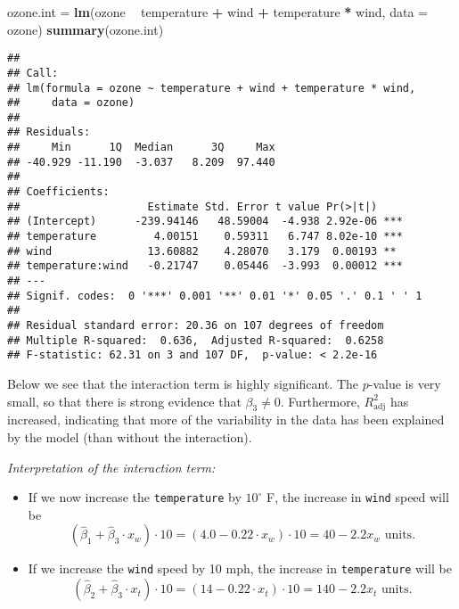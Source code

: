 \documentclass[ignorenonframetext,]{beamer}
\newenvironment{Shaded}{\begin{snugshade}}{\end{snugshade}}
\newcommand{\KeywordTok}[1]{\textcolor[rgb]{0.13,0.29,0.53}{\textbf{#1}}}
\newcommand{\DataTypeTok}[1]{\textcolor[rgb]{0.13,0.29,0.53}{#1}}
\newcommand{\StringTok}[1]{\textcolor[rgb]{0.31,0.60,0.02}{#1}}
\newcommand{\OperatorTok}[1]{\textcolor[rgb]{0.81,0.36,0.00}{\textbf{#1}}}
\newcommand{\NormalTok}[1]{#1}
\begin{document}
\begin{frame}[fragile]

\footnotesize

\begin{Shaded}
\begin{Highlighting}[]
\NormalTok{ozone.int =}\StringTok{ }\KeywordTok{lm}\NormalTok{(ozone }\OperatorTok{~}\StringTok{ }\NormalTok{temperature }\OperatorTok{+}\StringTok{ }\NormalTok{wind }\OperatorTok{+}\StringTok{ }\NormalTok{temperature }\OperatorTok{*}\StringTok{ }\NormalTok{wind, }\DataTypeTok{data =}\NormalTok{ ozone)}
\KeywordTok{summary}\NormalTok{(ozone.int)}
\end{Highlighting}
\end{Shaded}

\begin{verbatim}
## 
## Call:
## lm(formula = ozone ~ temperature + wind + temperature * wind, 
##     data = ozone)
## 
## Residuals:
##     Min      1Q  Median      3Q     Max 
## -40.929 -11.190  -3.037   8.209  97.440 
## 
## Coefficients:
##                    Estimate Std. Error t value Pr(>|t|)    
## (Intercept)      -239.94146   48.59004  -4.938 2.92e-06 ***
## temperature         4.00151    0.59311   6.747 8.02e-10 ***
## wind               13.60882    4.28070   3.179  0.00193 ** 
## temperature:wind   -0.21747    0.05446  -3.993  0.00012 ***
## ---
## Signif. codes:  0 '***' 0.001 '**' 0.01 '*' 0.05 '.' 0.1 ' ' 1
## 
## Residual standard error: 20.36 on 107 degrees of freedom
## Multiple R-squared:  0.636,  Adjusted R-squared:  0.6258 
## F-statistic: 62.31 on 3 and 107 DF,  p-value: < 2.2e-16
\end{verbatim}

\normalsize

\end{frame}

\begin{frame}

Below we see that the interaction term is highly significant. The
\(p\)-value is very small, so that there is strong evidence that
\(\beta_3 \neq 0\). Furthermore, \(R^2_{\text{adj}}\) has increased,
indicating that more of the variability in the data has been explained
by the model (than without the interaction).

\end{frame}

\begin{frame}[fragile]

\emph{Interpretation of the interaction term:}

\begin{itemize}
\item
  If we now increase the \texttt{temperature} by \(10^{\circ}\) F, the
  increase in \texttt{wind} speed will be
  \[(\hat \beta_1+\hat \beta_3 \cdot x_w) \cdot 10 = (4.0 -0.22 \cdot x_w) \cdot 10 = 40-2.2 x_w \text{ units}.\]
\item
  If we increase the \texttt{wind} speed by 10 mph, the increase in
  \texttt{temperature} will be
  \[(\hat \beta_2 + \hat \beta_3 \cdot x_t) \cdot 10 = (14 -0.22 \cdot x_t) \cdot 10 = 140-2.2 x_t \text{ units}.\]
\end{itemize}

\end{frame}
\end{document}
